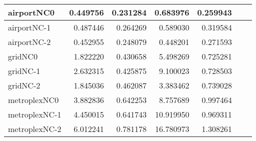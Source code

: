 \begin{longtable}{|l|r|r|r|r|r|r|}
airportNC0 & 0.449756 & 0.231284 & 0.683976 & 0.259943 \\ \hline
airportNC-1 & 0.487446 & 0.264269 & 0.589030 & 0.319584 \\ \hline
airportNC-2 & 0.452955 & 0.248079 & 0.448201 & 0.271593 \\ \hline
gridNC0 & 1.822220 & 0.430658 & 5.498269 & 0.725281 \\ \hline
gridNC-1 & 2.632315 & 0.425875 & 9.100023 & 0.728503 \\ \hline
gridNC-2 & 1.845036 & 0.462087 & 3.383462 & 0.739028 \\ \hline
metroplexNC0 & 3.882836 & 0.642253 & 8.757689 & 0.997464 \\ \hline
metroplexNC-1 & 4.450015 & 0.641743 & 10.919950 & 0.969311 \\ \hline
metroplexNC-2 & 6.012241 & 0.781178 & 16.780973 & 1.308261 \\ \hline
\end{longtable}

